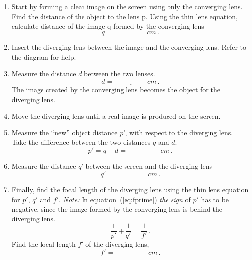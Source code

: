 \documentclass[11pt, a4paper]{article}
\begin{document}
\begin{enumerate}
    \item Start by forming a clear image on the screen using only the converging lens. Find the distance of the object to the lens p.
        Using the thin lens equation, calculate distance of the image q formed by the converging lens
        \begin{equation*}
            q = \underline{\hspace{2cm}} \si{cm}\,.
        \end{equation*}

    \item Insert the diverging lens between the image and the converging lens. Refer to the diagram for help.\\
    \item Measure the distance $d$ between the two lenses.
        \begin{equation*}
            d = \underline{\hspace{2cm}} \si{cm}\,.
        \end{equation*}
        The image created by the converging lens becomes the object for the diverging lens.
    \item Move the diverging lens until a real image is produced on the screen.
    \item Measure the ``new'' object distance $p'$, with respect to the diverging lens. Take the difference between the two distances $q$ and $d$.
        \begin{equation*}
            p' = q - d  = \underline{\hspace{2cm}} \si{cm}\,.
        \end{equation*}
    \item Measure the distance $q'$ between the screen and the diverging lens
        \begin{equation*}
            q'  = \underline{\hspace{2cm}} \si{cm}\,.
        \end{equation*}
    \item Finally, find the focal length of the diverging lens using the thin lens equation for $p'$, $q'$ and $f'$.
        \textit{Note:} In equation~(\ref{eq:fprime}) \textit{the sign} of $p'$ has to be negative, since the image formed by the converging lens is behind the diverging lens.
        \begin{equation}
            \frac{1}{p'} + \frac{1}{q'} = \frac{1}{f'}\,.
            \label{eq:fprime}
        \end{equation}
        Find the focal length $f'$ of the diverging lens,
        \begin{equation*}
            f'  = \underline{\hspace{2cm}} \si{cm}\,.
        \end{equation*}
\end{enumerate}
\end{document}
